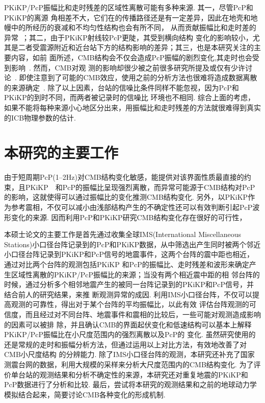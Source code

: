 PKiKP/PcP振幅比和走时残差的区域性离散可能有多种来源. 其一，尽管PcP和PKiKP的离源
角相差不大，它们在的传播路径还是有一定差异，因此在地壳和地幔中的所经历的衰减和不均匀性结构也会有所不同，
从而贡献振幅比和走时差的异常~\citep{Tkalcic2010a}；其二，由于PKiKP射线较PcP更陡，其受到横向结构
变化的影响较小，尤其是二者受震源附近和近台站下方的结构影响的差异；其三，也是本研究关注的主要内容，如前
面所述，CMB结构会不仅会造成PcP振幅的剧烈变化,其走时也会受到影响~\citep{Koper2003}. 然而，CMB对观
测的影响却很少被之前很多研究所提及或仅有少许讨论~\citep{Cao2004,Waszek2015a,Dai2012,Tanaka2015a}. 即使注意到了可能的CMB效应，使用之前的分析方法也很难将造成数据离散的来源确定~\citep{Koper2004a}. 除了以上因素，台站的信噪比条件同样不能忽视，因为PcP和PKiKP的到时不同，而两者被记录时的信噪比
环境也不相同. 综合上面的考虑，如果不能将每种来源小心地区分出来，用振幅比和走时残差的方法就很难得到真实
的ICB物理参数的估计. 

\section{本研究的主要工作}
由于短周期PcP(1--2Hz)对CMB结构变化敏感，能提供对该界面性质最直接的约束，且PKiKP　和PcP的振幅比呈现强烈离散，而异常可能源于CMB结构对PcP的影响，这就使得可以通过振幅比的变化推测CMB结构变化. 另外，以PKiKP作为参考震相，不仅可以减小由浅部结构产生的不确定性还可以有效判断引起PcP波形变化的来源. 因而利用PcP和PKiKP研究CMB结构变化存在很好的可行性，

本硕士论文的主要工作是首先通过收集全球IMS(International Miscellaneous Stations)小口径台阵记录到的PcP和PKiKP数据，从中筛选出产生同时被两个邻近小口径台阵记录到PKiKP和PcP信号的地震事件，这两个台阵的震中距也相近，通过对比两个台阵的观测包括PKiKP
和PcP的振幅比、走时残差和波形来确定产生区域性离散的PKiKP/PcP振幅比的来源；当没有两个相近震中距的相
邻台阵的时候，通过分析多个相邻地震产生的被同一台阵记录到的PKiKP和PcP信号，并结合前人的研究结果，来推
断观测异常的成因. 利用IMS小口径台阵，不仅可以提高观测的可靠性，得出对于某个台阵的平均振幅比，以此有效
评估台阵观测的可信度，而且经过对不同台阵、地震事件和震相的比较后，一些可能对观测造成影响的因素可以被排
除，并且确认CMB的界面起伏变化和低速结构可以基本上解释PKiKP/PcP振幅比在小尺度范围内的强烈离散以及PcP的
变化. 虽然研究使用的还是常规的走时和振幅分析方法，但通过运用以上对比方法，有效地改善了对CMB小尺度结构
的分辨能力. 除了IMS小口径台阵的观测，本研究还补充了国家测震台网的数据，利用大规模的采样来分析大尺度范围内的CMB结构变化. 为了评价单台站的观测结果和分析不确定性的来源，本研究还对重复地震的PKiKP和PcP数据进行了分析和比较. 最后，尝试将本研究的观测结果和之前的地球动力学模拟结合起来，简要讨论CMB各种变化的形成机制. 